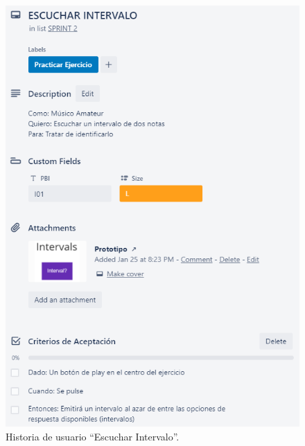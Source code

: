 \documentclass[12pt,twoside,titlepage]{report}
\begin{document}
\begin{figure}[H]
    \centering
    \includegraphics[scale=1.3]{Scrum/User Stories/Intervalos}
    \caption{Historia de usuario ``Escuchar Intervalo''.}
    \label{fig:Intervalos}
\end{figure}
\end{document}

